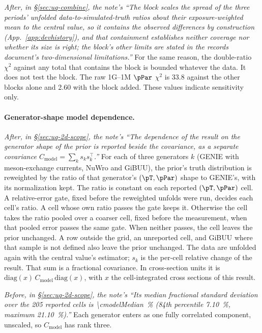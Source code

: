 \emph{After, in \S\ref{sec:uq-combine}, the note's ``The block scales the spread of the three periods' unfolded data-to-simulated-truth ratios about their exposure-weighted mean to the central value, so it contains the observed differences by construction (App.~\ref{app:devhistory}), and that containment establishes neither coverage nor whether its size is right; the block's other limits are stated in the records document's two-dimensional limitations.''}
For the same reason, the double-ratio $\chi^{2}$ against any total that contains the block is bounded whatever the data. It does not test the block. The raw 1G--1M $\pPar$ $\chi^{2}$ is 33.8 against the other blocks alone and 2.60 with the block added. These values indicate sensitivity only. %

\paragraph{Generator-shape model dependence.}
\emph{After, in \S\ref{sec:uq-2d-scope}, the note's ``The dependence of the result on the generator shape of the prior is reported beside the covariance, as a separate covariance $C_{\mathrm{model}}=\sum_k s_k s_k^{\top}$.''}
For each of three generators $k$ (GENIE with meson-exchange currents, NuWro and GiBUU), the prior's truth distribution is reweighted by the ratio of that generator's $(\pT,\pPar)$ shape to GENIE's, with its normalization kept. The ratio is constant on each reported $(\pT,\pPar)$ cell. A relative-error gate, fixed before the reweighted unfolds were run, decides each cell's ratio. A cell whose own ratio passes the gate keeps it. Otherwise the cell takes the ratio pooled over a coarser cell, fixed before the measurement, when that pooled error passes the same gate. When neither passes, the cell leaves the prior unchanged. A row outside the grid, an unreported cell, and GiBUU where that sample is not defined also leave the prior unchanged. The data are unfolded again with the central value's estimator; $s_k$ is the per-cell relative change of the result. That sum is a fractional covariance. In cross-section units it is $\mathrm{diag}(x)\,C_{\mathrm{model}}\,\mathrm{diag}(x)$, with $x$ the cell-integrated cross sections of this result.

\emph{Before, in \S\ref{sec:uq-2d-scope}, the note's ``Its median fractional standard deviation over the 205 reported cells is \SI{\cmodelMedian}{\percent} (84th percentile \SI{7.10}{\percent}, maximum \SI{21.10}{\percent}).''}
Each generator enters as one fully correlated component, unscaled, so $C_{\mathrm{model}}$ has rank three.

